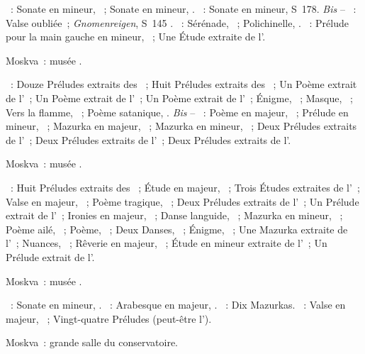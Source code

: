 \begin{description}
 \textsc{\Beethoven{}}~: Sonate en \kC \Sharp mineur,  ~;
 Sonate en \kF mineur, .
 \textsc{\Liszt{}}~: Sonate en \kB mineur, S~178.
 \emph{Bis} -- \textsc{\Liszt{}}~: Valse oubliée~; \emph{Gnomenreigen},
 S~145 .
 \textsc{\Rachmaninov{}}~: Sérénade,  ~; Polichinelle,
  .
 \textsc{\Scriabine{}}~: Prélude pour la main gauche en \kC \Sharp mineur,
  ~; Une Étude extraite de l'.
 \item[\DateWithWeekDay{1948-05-28}]
 Moskva~: musée \Scriabine{}.

 \textsc{\Scriabine{}}~: Douze Préludes extraits des ~; Huit Préludes extraits des ~; Un Poème
 extrait de l'~; Un Poème extrait de l'~; Un Poème extrait
 de l'~; Énigme,  ~; Masque, 
 ~; Vers la flamme, ~; Poème satanique, .
 \emph{Bis} -- \textsc{\Scriabine{}}~: Poème en \kF \Sharp majeur, 
 ~; Prélude en \kC \Sharp mineur,  ~; Mazurka
 en \kF \Sharp majeur,  ~; Mazurka en \kE mineur,
  ~; Deux Préludes extraits de l'~; Deux
 Préludes extraits de l'~; Deux Préludes extraits de l'.
 \item[\DateWithWeekDay{1948-06-15}]
 Moskva~: musée \Scriabine{}.

 \textsc{\Scriabine{}}~: Huit Préludes extraits des ~;
 Étude en \kB majeur,  ~; Trois Études extraites de
 l'~; Valse en \kA \Flat majeur, ~; Poème tragique,
 ~; Deux Préludes extraits de l'~; Un Prélude extrait de
 l'~; Ironies en \kC majeur,  ~; Danse languide,
  ~; Mazurka en \kE mineur,  ~; Poème
 ailé,  ~; Poème,  ~; Deux Danses,
 ~; Énigme,  ~; Une Mazurka extraite de
 l'~; Nuances,  ~; Rêverie en \kC majeur,
  ~; Étude en \kB \Flat mineur extraite de l'~;
 Un Prélude extrait de l'.
 \item[\DateWithWeekDay{1948-10-03}]
 Moskva~: musée \Scriabine{}.

 \textsc{\Beethoven{}}~: Sonate en \kC mineur, .
 \textsc{\Schumann{}}~: Arabesque en \kC majeur, .
 \textsc{\Chopin{}}~: Dix Mazurkas.
 \textsc{\Scriabine{}}~: Valse en \kA \Flat majeur, ~; Vingt-quatre
 Préludes (peut-être l').
 \item[\DateWithWeekDay{1948-10-12}]
 Moskva~: grande salle du conservatoire.


\end{description}
